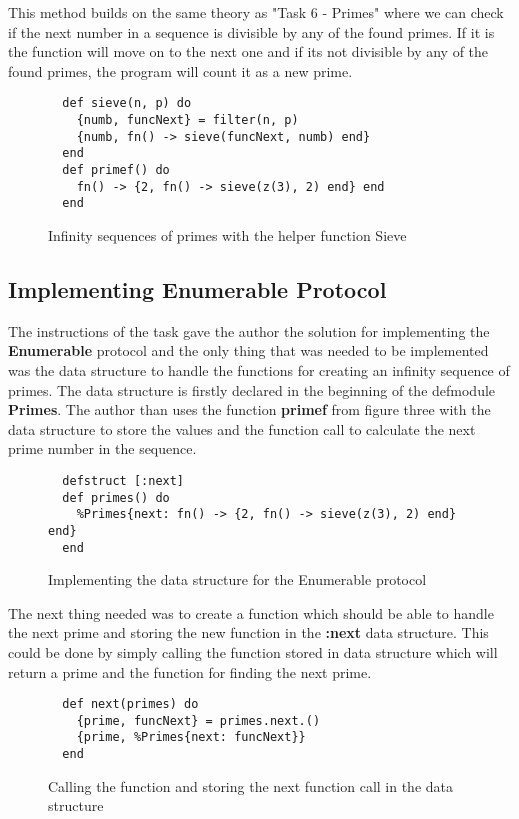 \documentclass[a4paper,11pt]{article}
\begin{document}
This method builds on the same theory as "Task 6 - Primes" where we can check if the next number in a sequence is divisible by any of the found primes. If it is the function will move on to the next one and if its not divisible by any of the found primes, the program will count it as a new prime.

\begin{figure}[H]
\begin{verbatim}
  def sieve(n, p) do
    {numb, funcNext} = filter(n, p)
    {numb, fn() -> sieve(funcNext, numb) end}
  end
  def primef() do
    fn() -> {2, fn() -> sieve(z(3), 2) end} end
  end
\end{verbatim}
\caption{Infinity sequences of primes with the helper function Sieve}
\label{Figure:3}
\end{figure}

\subsection*{Implementing Enumerable Protocol}
The instructions of the task gave the author the solution for implementing the \textbf{Enumerable} protocol and the only thing that was needed to be implemented was the data structure to handle the functions for creating an infinity sequence of primes. The data structure is firstly declared in the beginning of the defmodule \textbf{Primes}. The author than uses the function \textbf{primef} from figure three with the data structure to store the values and the function call to calculate the next prime number in the sequence.

\begin{figure}[H]
\begin{verbatim}
  defstruct [:next]
  def primes() do
    %Primes{next: fn() -> {2, fn() -> sieve(z(3), 2) end} end}
  end
\end{verbatim}
\caption{Implementing the data structure for the Enumerable protocol}
\label{Figure:4}
\end{figure}

The next thing needed was to create a function which should be able to handle the next prime and storing the new function in the \textbf{:next} data structure. This could be done by simply calling the function stored in data structure which will return a prime and the function for finding the next prime.

\begin{figure}[H]
\begin{verbatim}
  def next(primes) do
    {prime, funcNext} = primes.next.()
    {prime, %Primes{next: funcNext}}
  end
\end{verbatim}
\caption{Calling the function and storing the next function call in the data structure}
\label{Figure:5}
\end{figure}
\end{document}
